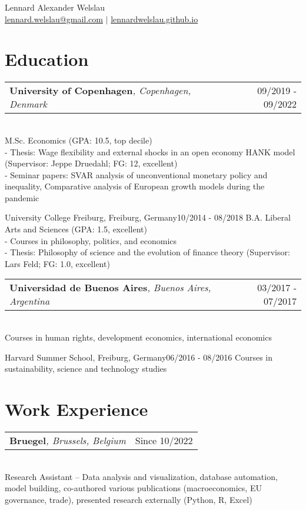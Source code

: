 \documentclass[A4,11pt]{article}
\makeatletter
\newcommand{\Subheading}[5]{   
    \begin{tabular*}{0.97\textwidth}[t]{l@{\extracolsep{\fill}}r}
      \textbf{#1}\textit{\small #2} & \small #3 
      \end{tabular*} \\
      \small #4 \\
    \vspace{7pt}
    }
\makeatother
\begin{document}
\begin{center}
    {\Large Lennard Alexander Welslau} \\ 
    \href{mailto:lennard.welslau@gmail.com}{lennard.welslau@gmail.com} $|$ \href{https://lennardwelslau.github.io/}{lennardwelslau.github.io}

\end{center}


\section{Education}
    \Subheading
        {University of Copenhagen}{, Copenhagen, Denmark}{09/2019 - 09/2022}
        {M.Sc. Economics (GPA: 10.5, top decile) \\
        - Thesis: Wage flexibility and external shocks in an open economy HANK model (Supervisor: Jeppe Druedahl; FG: 12, excellent) \href{https://lennardwelslau.github.io/Welslau_MA_Thesis_2022_Wage_Flexibility_Open_Economy_HANK.pdf}{\scriptsize\faExternalLink} \\
        - Seminar papers: SVAR analysis of unconventional monetary policy and inequality, Comparative analysis of European growth models during the pandemic}

    \Subheading
        {University College Freiburg}{, Freiburg, Germany}{10/2014 - 08/2018}
        {B.A. Liberal Arts and Sciences (GPA: 1.5, excellent) \\
        - Courses in philosophy, politics, and economics \\
        - Thesis: Philosophy of science and the evolution of finance theory (Supervisor: Lars Feld; FG: 1.0, excellent)}

    \Subheading
        {Universidad de Buenos Aires}{, Buenos Aires, Argentina}{03/2017 - 07/2017}
        {Courses in human rights, development economics, international economics}

    \Subheading
        {Harvard Summer School}{, Freiburg, Germany}{06/2016 - 08/2016}
        {Courses in sustainability, science and technology studies}

\section{Work Experience}
    \Subheading
        {Bruegel}{, Brussels, Belgium}{Since 10/2022}
        {Research Assistant -- Data analysis and visualization, database automation, model building, co-authored various publications (macroeconomics, EU governance, trade), presented research externally (Python, R, Excel)}{}
\end{document}
